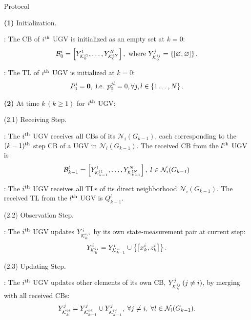	\begin{algorithm}
		\caption{{\proto} Protocol}
		\label{alg:lifo}
		\begin{algorithmic}
			\State \textbf{(1)} Initialization.
			
			\CB: 
			The CB of $i^\text{th}$ UGV is initialized as an empty set at $k=0$:
			\small\begin{equation*}
				{\mathcal{B}^i_0=\left[ Y^1_{\mathcal{K}^{i1}_{0}},\dots,Y^N_{\mathcal{K}^{iN}_{0}}\right], \text{ where } Y^j_{\mathcal{K}^{ij}_0} = \left\lbrace\left[ \varnothing,\varnothing\right]\right\rbrace.}
			\end{equation*}\normalsize
			
			\TL:
			The TL of $i^\text{th}$ UGV is initialized at $k=0$:
			\small\begin{equation*}
				P^i_0 = \mathbf{0},\;\text{i.e. } p^{jl}_0=0, \forall j,l\in \left\lbrace 1\dots,N\right\rbrace.
			\end{equation*}\normalsize
			
			\State \textbf{(2)} At time $k\,(k\geq 1)$ for $i^\text{th}$ UGV:	
			
			\State (2.1) Receiving Step.
			
			\CB:	The $i^\text{th}$ UGV receives all CBs of its {\dnbhd} $\mathcal{N}_i(G_{k-1})$,
			each corresponding to the $(k-1)^\text{th}$ step CB of a UGV in $\mathcal{N}_i(G_ {k-1})$. 
			The received CB from the $l^\text{th}$ UGV is
			\small\begin{equation*}
				\mathcal{B}^l_{k-1}=\left[Y^1_{\mathcal{K}^{l1}_{k-1}},\dots,Y^N_{\mathcal{K}^{lN}_{k-1}}\right],\; l\in\mathcal{N}_i(G_{k-1})
			\end{equation*}\normalsize
			
			\TL: The $i^\text{th}$ UGV receives all TLs of its direct neighborhood $\mathcal{N}_i(G_{k-1})$.
			The received TL from the $l^\text{th}$ UGV is $Q^l_{k-1}$.
			\newline
			
			\State (2.2) Observation Step.
			
			\CB: The $i^\text{th}$ UGV updates $Y^i_{\mathcal{K}^{i,i}_{k}}$ by its own state-measurement pair at current step:
			\small\begin{equation*}
			Y^i_{\mathcal{K}^{ii}_{k}} = Y^i_{\mathcal{K}^{ii}_{k-1}} \cup \left\lbrace{\left[x^i_k,z^i_k\right]}\right\rbrace.
			\end{equation*}\normalsize
						
			\State (2.3) Updating Step.
			
			\CB: The $i^\text{th}$ UGV updates other elements of its own CB, $Y^j_{\mathcal{K}^{ij}_{k}}\,(j\neq i)$, by merging with all received CBs:						
			\small\begin{equation*}
				Y^j_{\mathcal{K}^{ij}_{k}} = Y^j_{\mathcal{K}^{ij}_{k-1}} \cup Y^j_{\mathcal{K}^{lj}_{k-1}},
				\; \forall j\neq i,\;\forall l\in \mathcal{N}_i(G_{k-1}).
			\end{equation*}\normalsize
			

\end{algorithmic}
\end{algorithm}
